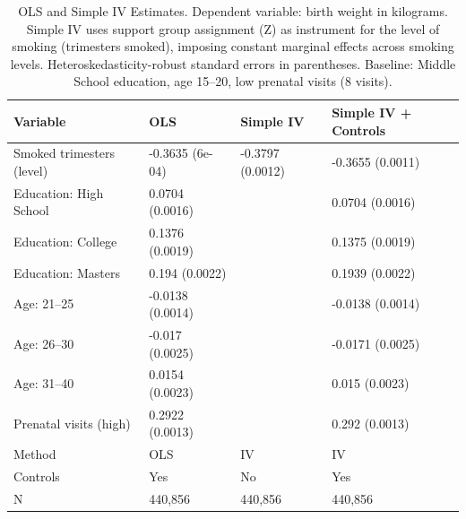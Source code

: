 \begin{table}[ht]
\centering
\caption{OLS and Simple IV Estimates. Dependent variable: birth weight in kilograms. Simple IV uses support group assignment (Z) as instrument for the level of smoking (trimesters smoked), imposing constant marginal effects across smoking levels. Heteroskedasticity-robust standard errors in parentheses. Baseline: Middle School education, age 15--20, low prenatal visits (8 visits).} 
\label{tab:simple_iv}
\begin{tabular}{llll}
  \toprule
Variable & OLS & Simple IV & Simple IV + Controls \\ 
  \midrule
Smoked trimesters (level) & -0.3635 (6e-04) & -0.3797 (0.0012) & -0.3655 (0.0011) \\ 
  Education: High School & 0.0704 (0.0016) &  & 0.0704 (0.0016) \\ 
  Education: College & 0.1376 (0.0019) &  & 0.1375 (0.0019) \\ 
  Education: Masters & 0.194 (0.0022) &  & 0.1939 (0.0022) \\ 
  Age: 21--25 & -0.0138 (0.0014) &  & -0.0138 (0.0014) \\ 
  Age: 26--30 & -0.017 (0.0025) &  & -0.0171 (0.0025) \\ 
  Age: 31--40 & 0.0154 (0.0023) &  & 0.015 (0.0023) \\ 
  Prenatal visits (high) & 0.2922 (0.0013) &  & 0.292 (0.0013) \\ 
  Method & OLS & IV & IV \\ 
  Controls & Yes & No & Yes \\ 
  N & 440,856 & 440,856 & 440,856 \\ 
   \bottomrule
\end{tabular}
\end{table}
